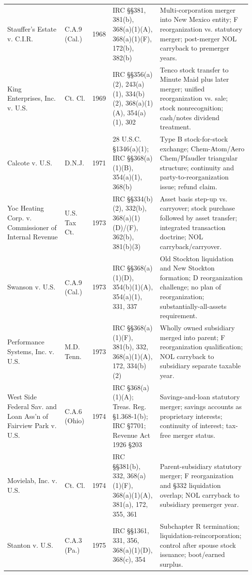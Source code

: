 \begin{footnotesize}
\begin{longtable}{p{}p{}p{}p{}p{}}
Stauffer's Estate v. C.I.R. & C.A.9 (Cal.) & 1968 & IRC \S\S 381, 381(b), 368(a)(1)(A), 368(a)(1)(F), 172(b), 382(b) & Multi-corporation merger into New Mexico entity; F reorganization vs. statutory merger; post-merger NOL carryback to premerger years. \\
King Enterprises, Inc. v. U.S. & Ct. Cl. & 1969 & IRC \S\S 356(a)(2), 243(a)(1), 334(b)(2), 368(a)(1)(A), 354(a)(1), 302 & Tenco stock transfer to Minute Maid plus later merger; unified reorganization vs. sale; stock nonrecognition; cash/notes dividend treatment. \\
Calcote v. U.S. & D.N.J. & 1971 & 28 U.S.C. \S 1346(a)(1); IRC \S\S 368(a)(1)(B), 354(a)(1), 368(b) & Type B stock-for-stock exchange; Chem-Atom/Aero Chem/Pfaudler triangular structure; continuity and party-to-reorganization issue; refund claim. \\
Yoc Heating Corp. v. Commissioner of Internal Revenue & U.S. Tax Ct. & 1973 & IRC \S\S 334(b)(2), 332(b), 368(a)(1)(D)/(F), 362(b), 381(b)(3) & Asset basis step-up vs. carryover; stock purchase followed by asset transfer; integrated transaction doctrine; NOL carryback/carryover. \\
Swanson v. U.S. & C.A.9 (Cal.) & 1973 & IRC \S\S 368(a)(1)(D), 354(b)(1)(A), 354(a)(1), 331, 337 & Old Stockton liquidation and New Stockton formation; D reorganization challenge; no plan of reorganization; substantially-all-assets requirement. \\
Performance Systems, Inc. v. U.S. & M.D. Tenn. & 1973 & IRC \S\S 368(a)(1)(F), 381(b), 332, 368(a)(1)(A), 172, 334(b)(2) & Wholly owned subsidiary merged into parent; F reorganization qualification; NOL carryback to subsidiary separate taxable year. \\
West Side Federal Sav. and Loan Ass'n of Fairview Park v. U.S. & C.A.6 (Ohio) & 1974 & IRC \S 368(a)(1)(A); Treas. Reg. \S 1.368-1(b); IRC \S 7701; Revenue Act 1926 \S 203 & Savings-and-loan statutory merger; savings accounts as proprietary interests; continuity of interest; tax-free merger status. \\
Movielab, Inc. v. U.S. & Ct. Cl. & 1974 & IRC \S\S 381(b), 332, 368(a)(1)(F), 368(a)(1)(A), 381(a), 172, 355, 361 & Parent-subsidiary statutory merger; F reorganization and \S 332 liquidation overlap; NOL carryback to subsidiary premerger year. \\
Stanton v. U.S. & C.A.3 (Pa.) & 1975 & IRC \S\S 1361, 331, 356, 368(a)(1)(D), 368(c), 354 & Subchapter R termination; liquidation-reincorporation; control after spouse stock issuance; boot/earned surplus. \\

\end{longtable}
\end{footnotesize}
